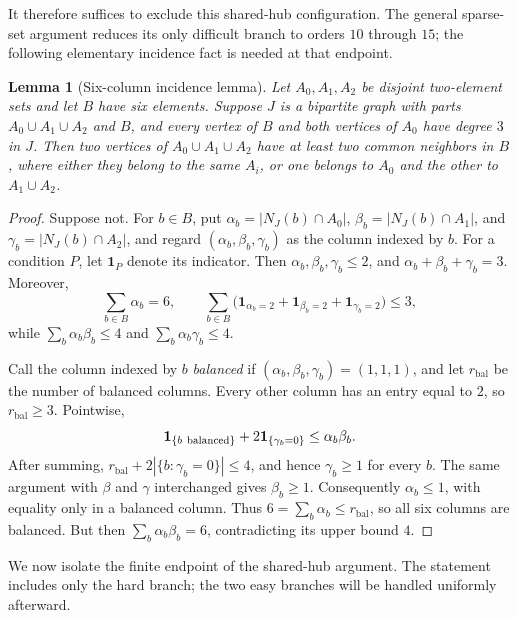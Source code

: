 \documentclass[11pt]{article}
\numberwithin{equation}{section}
\newtheorem{lemma}[theorem]{Lemma}
\theoremstyle{definition}
\theoremstyle{remark}
\begin{document}
It therefore suffices to exclude this shared-hub configuration.  The
general sparse-set argument reduces its only difficult branch to orders
\(10\) through \(15\); the following elementary incidence fact is needed
at that endpoint.

\begin{lemma}[Six-column incidence lemma]\label{lem:six-column}
Let \(A_0,A_1,A_2\) be disjoint two-element sets and let \(B\) have six
elements.  Suppose \(J\) is a bipartite graph with parts
\(A_0\cup A_1\cup A_2\) and \(B\), and every vertex of \(B\) and both
vertices of \(A_0\) have degree \(3\) in \(J\).  Then two vertices of
\(A_0\cup A_1\cup A_2\) have at least two common neighbors in \(B\),
where either they belong to the same \(A_i\), or one belongs to \(A_0\)
and the other to \(A_1\cup A_2\).
\end{lemma}

\begin{proof}
Suppose not.  For \(b\in B\), put
\(\alpha_b=|N_J(b)\cap A_0|\), \(\beta_b=|N_J(b)\cap A_1|\), and
\(\gamma_b=|N_J(b)\cap A_2|\), and regard
\((\alpha_b,\beta_b,\gamma_b)\) as the column indexed by \(b\).  For a
condition \(P\), let \(\mathbf1_P\) denote its indicator.  Then
\(\alpha_b,\beta_b,\gamma_b\le2\), and
\(\alpha_b+\beta_b+\gamma_b=3\).  Moreover,
\[
 \sum_{b\in B}\alpha_b=6,\qquad
 \sum_{b\in B}\!\bigl(\mathbf1_{\alpha_b=2}
   +\mathbf1_{\beta_b=2}+\mathbf1_{\gamma_b=2}\bigr)\le3,
\]
while
\(\sum_b\alpha_b\beta_b\le4\) and
\(\sum_b\alpha_b\gamma_b\le4\).

Call the column indexed by \(b\) \emph{balanced} if
\((\alpha_b,\beta_b,\gamma_b)=(1,1,1)\), and let \(r_{\mathrm{bal}}\) be the
number of balanced columns.  Every other column has an entry equal to \(2\),
so \(r_{\mathrm{bal}}\ge3\).  Pointwise,
\[
 \mathbf1_{\{b\ {\rm balanced}\}}+2\mathbf1_{\{\gamma_b=0\}}
 \le\alpha_b\beta_b.
\]
After summing, \(r_{\mathrm{bal}}+2|\{b:\gamma_b=0\}|\le4\), and hence
\(\gamma_b\ge1\) for every \(b\).  The same argument with
\(\beta\) and \(\gamma\) interchanged gives \(\beta_b\ge1\).
Consequently \(\alpha_b\le1\), with equality only in a balanced
column.  Thus \(6=\sum_b\alpha_b\le r_{\mathrm{bal}}\), so all six columns are
balanced.  But then \(\sum_b\alpha_b\beta_b=6\), contradicting its
upper bound \(4\).
\end{proof}

We now isolate the finite endpoint of the shared-hub argument.  The
statement includes only the hard branch; the two easy branches will be
handled uniformly afterward.
\end{document}
